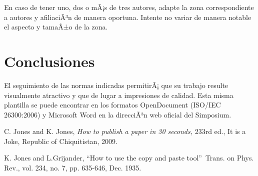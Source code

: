 \documentclass[10pt,conference,a4paper]{IEEEtran}
\begin{document}
En caso de tener uno, dos o mÃ¡s de tres autores, adapte la zona
correspondiente a autores y afiliaciÃ³n de manera oportuna. Intente no variar
de manera notable el aspecto y tamaÃ±o de la zona.

\section{Conclusiones}

El seguimiento de las normas indicadas permitirÃ¡ que su trabajo resulte
visualmente atractivo y que de lugar a impresiones de calidad. Esta misma
plantilla se puede encontrar en los formatos OpenDocument (ISO/IEC 26300:2006)
y Microsoft Word\textsuperscript{\textregistered} en la direcciÃ³n web oficial del Simposium.


\begin{thebibliography}{9}                                                                                                %
    C. Jones and K. Jones, \emph{How to publish a paper in 30
	seconds,} 233rd ed., It is a Joke, Republic of Chiquitistan, 2009.

    K. Jones and L.Grijander, \textquotedblleft How to use
	the copy and paste tool\textquotedblright\ Trans. on Phys. Rev., vol. 234, no.
	7, pp. 635-646, Dec. 1935.
\end{thebibliography}
\end{document}
